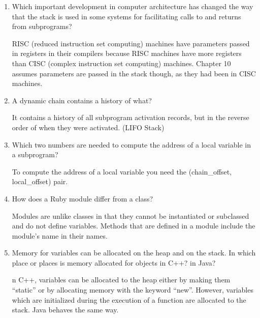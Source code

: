 \begin{enumerate}
  \item Which important development in computer architecture
    has changed the way that the stack is used in some
    systems for facilitating calls to and returns from
    subprograms?

  \begin{answer}
    RISC (reduced instruction set computing) machines have parameters passed in registers in their compilers because RISC machines have more registers than CISC (complex instruction set computing) machines. Chapter 10 assumes parameters are passed in the stack though, as they had been in CISC machines.
  \end{answer}

  \item A dynamic chain contains a history of what?

  \begin{answer}
    It contains a history of all subprogram activation records, but in the reverse order of when they were activated. (LIFO Stack)
  \end{answer}

  \item Which two numbers are needed to compute
    the address of a local variable in a subprogram?

  \begin{answer}
  To compute the address of a local variable you need the (chain\_offset, 
local\_offset) pair.
  \end{answer}

  \item How does a Ruby module differ from a class?

  \begin{answer}
  Modules are unlike classes in that they cannot be instantiated or subclassed
  and do not define variables. Methods that are defined in a module include the
  module’s name in their names.
  \end{answer}

  \item Memory for variables can be allocated on the heap
    and on the stack. In which place or places is memory
    allocated for objects in C++? in Java?

  \begin{answer}
  n C++, variables can be allocated to the heap either by making them “static” or by allocating memory with the keyword “new”. However, variables which are initialized during the execution of a function are allocated to the stack. Java behaves the same way. 
  \end{answer}


\end{enumerate}
